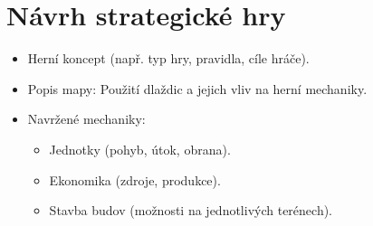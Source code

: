 \section{Návrh strategické hry}
\begin{itemize}
    \item Herní koncept (např. typ hry, pravidla, cíle hráče).
    \item Popis mapy: Použití dlaždic a jejich vliv na herní mechaniky.
    \item Navržené mechaniky:
    \begin{itemize}
        \item Jednotky (pohyb, útok, obrana).
        \item Ekonomika (zdroje, produkce).
        \item Stavba budov (možnosti na jednotlivých terénech).
    \end{itemize}
\end{itemize}

